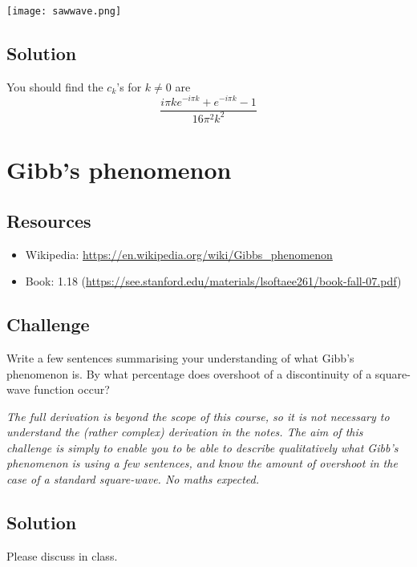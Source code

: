 \texttt{[image: sawwave.png]}

\subsection*{Solution}
You should find the $c_k$'s for $k \ne 0$ are
\begin{equation}
    \frac{i \pi k e^{-i \pi k} + e^{-i \pi k} - 1}{16 \pi^2 k^2}
\end{equation}




\newpage
\section{Gibb's phenomenon}

\subsection*{Resources}
\begin{itemize}
    \item Wikipedia: \url{https://en.wikipedia.org/wiki/Gibbs_phenomenon}
    \item Book: 1.18 (\url{https://see.stanford.edu/materials/lsoftaee261/book-fall-07.pdf})
\end{itemize}

\subsection*{Challenge}
Write a few sentences summarising your understanding of what Gibb's phenomenon is. By what percentage does overshoot of a discontinuity of a square-wave function occur?

\emph{The full derivation is beyond the scope of this course, so it is not necessary to understand the (rather complex) derivation in the notes. The aim of this challenge is simply to enable you to be able to describe qualitatively what Gibb's phenomenon is using a few sentences, and know the amount of overshoot in the case of a standard square-wave. No maths expected.}

\subsection*{Solution}
Please discuss in class.




\newpage

